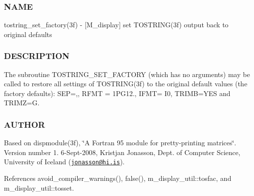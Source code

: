 \subsubsection*{N\+A\+ME}

tostring\+\_\+set\+\_\+factory(3f) -\/ \mbox{[}M\+\_\+display\mbox{]} set T\+O\+S\+T\+R\+I\+N\+G(3f) output back to original defaults 

\subsubsection*{D\+E\+S\+C\+R\+I\+P\+T\+I\+ON}

The subroutine T\+O\+S\+T\+R\+I\+N\+G\+\_\+\+S\+E\+T\+\_\+\+F\+A\+C\+T\+O\+RY (which has no arguments) may be called to restore all settings of T\+O\+S\+T\+R\+I\+N\+G(3f) to the original default values (the factory defaults)\+: S\+EP=\textquotesingle{},\textquotesingle{}, R\+F\+MT = \textquotesingle{}1\+P\+G12.\textquotesingle{}, I\+F\+MT= \textquotesingle{}I0\textquotesingle{}, T\+R\+I\+MB=\textquotesingle{}Y\+ES\textquotesingle{} and T\+R\+I\+MZ=\textquotesingle{}G\textquotesingle{}.

\subsubsection*{A\+U\+T\+H\+OR}

Based on dispmodule(3f), \char`\"{}\+A Fortran 95 module for pretty-\/printing matrices\char`\"{}. Version number 1. 6-\/\+Sept-\/2008, Kristjan Jonasson, Dept. of Computer Science, University of Iceland (\href{mailto:jonasson@hi.is}{\tt jonasson@hi.\+is}). 

References avoid\+\_\+compiler\+\_\+warnings(), false(), m\+\_\+display\+\_\+util\+::tosfac, and m\+\_\+display\+\_\+util\+::tosset.

\mbox{\label{namespacem__display_a9f3f8dad4340213fd6587a5657b366e0}} 
